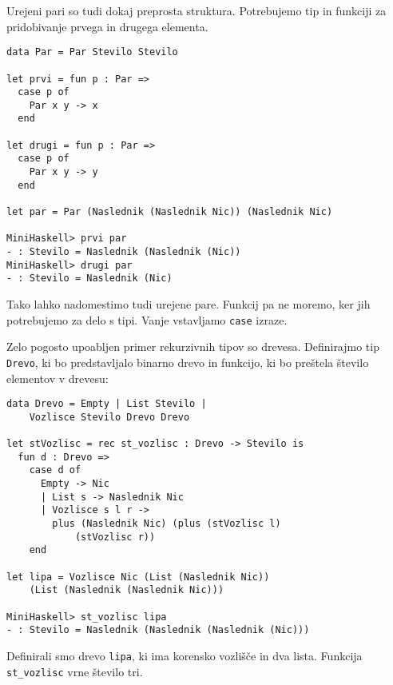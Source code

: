 \documentclass[12pt,a4paper,openany]{book}
\begin{document}
Urejeni pari so tudi dokaj preprosta struktura. Potrebujemo tip in funkciji za pridobivanje prvega in drugega elementa.
\begin{lstlisting}
data Par = Par Stevilo Stevilo

let prvi = fun p : Par =>
  case p of 
    Par x y -> x
  end

let drugi = fun p : Par =>
  case p of 
    Par x y -> y
  end

let par = Par (Naslednik (Naslednik Nic)) (Naslednik Nic)

MiniHaskell> prvi par
- : Stevilo = Naslednik (Naslednik (Nic))
MiniHaskell> drugi par
- : Stevilo = Naslednik (Nic)
\end{lstlisting}
Tako lahko nadomestimo tudi urejene pare. Funkcij pa ne moremo, ker jih potrebujemo za delo s tipi. Vanje vstavljamo \lstinline{case} izraze. 

Zelo pogosto upoabljen primer rekurzivnih tipov so drevesa. Definirajmo tip \lstinline{Drevo}, ki bo predstavljalo binarno drevo in funkcijo, ki bo preštela število elementov v drevesu:
\begin{lstlisting}	
data Drevo = Empty | List Stevilo | 
    Vozlisce Stevilo Drevo Drevo

let stVozlisc = rec st_vozlisc : Drevo -> Stevilo is
  fun d : Drevo =>
    case d of
      Empty -> Nic
      | List s -> Naslednik Nic
      | Vozlisce s l r ->
        plus (Naslednik Nic) (plus (stVozlisc l) 
            (stVozlisc r))
    end

let lipa = Vozlisce Nic (List (Naslednik Nic)) 
    (List (Naslednik (Naslednik Nic)))

MiniHaskell> st_vozlisc lipa
- : Stevilo = Naslednik (Naslednik (Naslednik (Nic)))
\end{lstlisting}
Definirali smo drevo \lstinline{lipa}, ki ima korensko vozlišče in dva lista. Funkcija \lstinline{st_vozlisc} vrne število tri.
\end{document}
